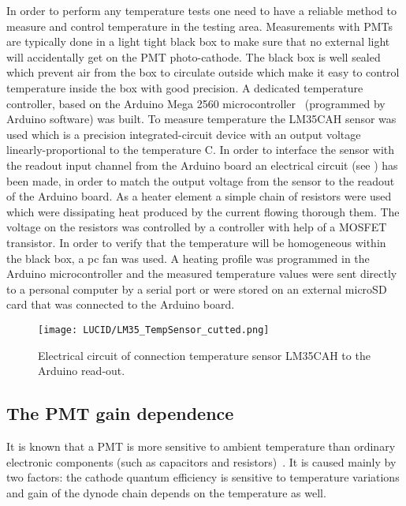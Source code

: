 In order to perform any temperature tests one need to have a reliable method to measure and control temperature in the testing area.
Measurements with PMTs are typically done in a light tight black box to make sure that no external light will accidentally get on the PMT photo-cathode.
The black box is well sealed which prevent air from the box to circulate outside which make it easy to control temperature inside the box with good 
precision.
A dedicated temperature controller, based on the Arduino Mega 2560 microcontroller~\cite{arduino} (programmed by Arduino software) was built.
To measure temperature the LM35CAH sensor was used which is a precision integrated-circuit device with an output voltage linearly-proportional to the 
temperature C\degree.
In order to interface the sensor with the readout input channel from the Arduino board an electrical circuit 
(see ) has been made, 
in order to match the output voltage from the sensor to the readout of the Arduino board.
As a heater element a simple chain of resistors were used which were dissipating heat produced by the current flowing thorough them. 
The voltage on the resistors was controlled by a controller with help of a MOSFET transistor. 
In order to verify that the temperature will be homogeneous within the black box,
a pc fan was used. A heating profile was programmed in the Arduino microcontroller and 
the measured temperature values were sent directly to a personal computer by a serial port or were stored on an external microSD card 
that was connected to the Arduino board.
 
\begin{figure}
\centering
\texttt{[image: LUCID/LM35\_TempSensor\_cutted.png]}
\caption{Electrical circuit of connection temperature sensor LM35CAH to the Arduino read-out.}
\label{fig:tempReadOutCircuit}
\end{figure}
 
\subsection{The PMT gain dependence}
\label{subsec:pmtGainTempDep}

It is known that a PMT is more sensitive to ambient temperature than ordinary 
electronic components (such as capacitors and resistors)~\cite{hamamatsu}.
It is caused mainly by two factors: the cathode quantum efficiency is sensitive to 
temperature variations and gain of the dynode chain depends on the temperature as well.

